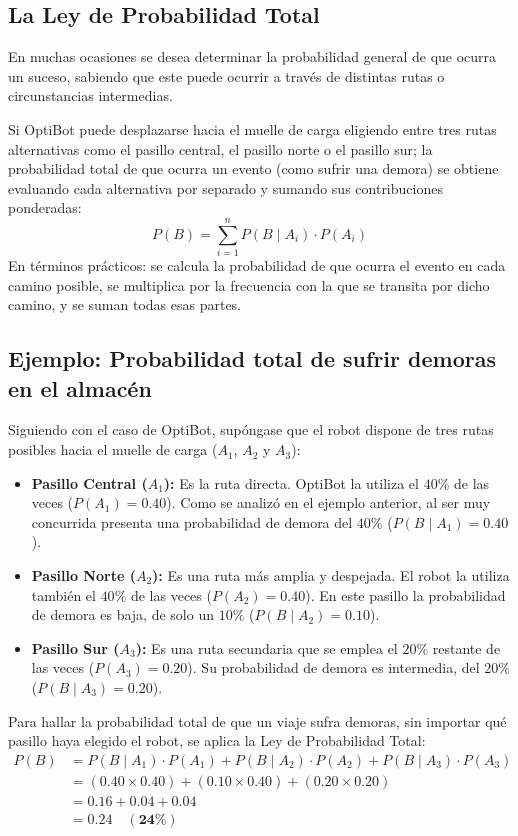 \subsection{La Ley de Probabilidad Total}
En muchas ocasiones se desea determinar la probabilidad general de que ocurra un suceso, sabiendo que este puede ocurrir a través de distintas rutas o circunstancias intermedias.

Si OptiBot puede desplazarse hacia el muelle de carga eligiendo entre tres rutas alternativas como el pasillo central, el pasillo norte o el pasillo sur; la probabilidad total de que ocurra un evento (como sufrir una demora) se obtiene evaluando cada alternativa por separado y sumando sus contribuciones ponderadas:
\begin{equation}
  P(B) = \sum_{i=1}^n P(B \mid A_i) \cdot P(A_i)
\end{equation}
En términos prácticos: se calcula la probabilidad de que ocurra el evento en cada camino posible, se multiplica por la frecuencia con la que se transita por dicho camino, y se suman todas esas partes.

\subsection*{Ejemplo: Probabilidad total de sufrir demoras en el almacén}
Siguiendo con el caso de OptiBot, supóngase que el robot dispone de tres rutas posibles hacia el muelle de carga ($A_1$, $A_2$ y $A_3$):
\begin{itemize}
  \item \textbf{Pasillo Central ($A_1$):} Es la ruta directa. OptiBot la utiliza el $40\%$ de las veces ($P(A_1) = 0.40$). Como se analizó en el ejemplo anterior, al ser muy concurrida presenta una probabilidad de demora del $40\%$ ($P(B \mid A_1) = 0.40$).
  \item \textbf{Pasillo Norte ($A_2$):} Es una ruta más amplia y despejada. El robot la utiliza también el $40\%$ de las veces ($P(A_2) = 0.40$). En este pasillo la probabilidad de demora es baja, de solo un $10\%$ ($P(B \mid A_2) = 0.10$).
  \item \textbf{Pasillo Sur ($A_3$):} Es una ruta secundaria que se emplea el $20\%$ restante de las veces ($P(A_3) = 0.20$). Su probabilidad de demora es intermedia, del $20\%$ ($P(B \mid A_3) = 0.20$).
\end{itemize}

Para hallar la probabilidad total de que un viaje sufra demoras, sin importar qué pasillo haya elegido el robot, se aplica la Ley de Probabilidad Total:
\begin{align*}
  P(B) &= P(B \mid A_1) \cdot P(A_1) + P(B \mid A_2) \cdot P(A_2) + P(B \mid A_3) \cdot P(A_3) \\
  &= (0.40 \times 0.40) + (0.10 \times 0.40) + (0.20 \times 0.20) \\
  &= 0.16 + 0.04 + 0.04 \\
  &= \mathbf{0.24 \quad (24\%)}
\end{align*}

